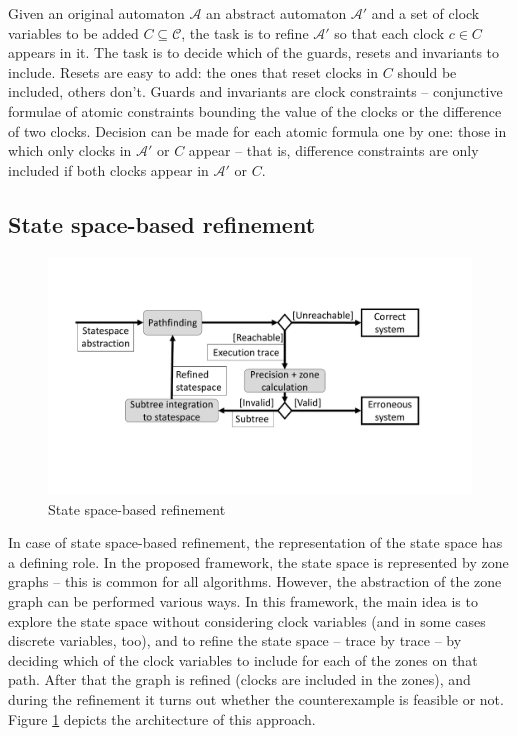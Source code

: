 Given an original automaton $\mathcal{A}$ an abstract automaton $\mathcal{A'}$ and a set of clock variables to be added $C \subseteq \mathcal{C}$, the task is to refine $\mathcal{A'}$ so that each clock $c \in C$ appears in it. The task is to decide which of the guards, resets and invariants to include. Resets are easy to add: the ones that reset clocks in $C$ should be included, others don't. Guards and invariants are clock constraints -- conjunctive formulae of atomic constraints bounding the value of the clocks or the difference of two clocks. Decision can be made for each atomic formula one by one: those in which only clocks in $\mathcal{A'}$ or $C$ appear -- that is, difference constraints are only included if both clocks appear in $\mathcal{A'}$ or $C$.

\subsection{State space-based refinement}

\begin{figure} 
	\centering
	\includegraphics[width=.7\textwidth]{include/figures/alg_arch_ssp}
	\caption{State space-based refinement}
	\label{fig:cegarssp}
\end{figure}


In case of state space-based refinement, the representation of the state space has a defining role. In the proposed framework, the state space is represented by zone graphs -- this is common for all algorithms. However, the abstraction of the zone graph can be performed various ways. In this framework, the main idea is to explore the state space without considering clock variables (and in some cases discrete variables, too), and to refine the state space -- trace by trace -- by deciding which of the clock variables to include for each of the zones on that path. After that the graph is refined (clocks are included in the zones), and during the refinement it turns out whether the counterexample is feasible or not. Figure \ref{fig:cegarssp} depicts the architecture of this approach.

